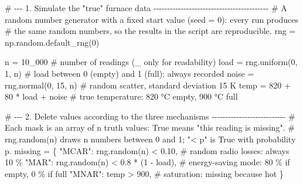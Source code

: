 \documentclass[
  letterpaper,
  DIV=11,
  numbers=noendperiod]{scrreprt}
\newenvironment{Shaded}{\begin{snugshade}}{\end{snugshade}}
\newcommand{\CommentTok}[1]{\textcolor[rgb]{0.37,0.37,0.37}{#1}}
\newcommand{\DecValTok}[1]{\textcolor[rgb]{0.68,0.00,0.00}{#1}}
\newcommand{\FloatTok}[1]{\textcolor[rgb]{0.68,0.00,0.00}{#1}}
\newcommand{\NormalTok}[1]{\textcolor[rgb]{0.00,0.23,0.31}{#1}}
\newcommand{\OperatorTok}[1]{\textcolor[rgb]{0.37,0.37,0.37}{#1}}
\newcommand{\StringTok}[1]{\textcolor[rgb]{0.13,0.47,0.30}{#1}}
\begin{document}
\begin{tcolorbox}[enhanced jigsaw, left=2mm, title=\textcolor{quarto-callout-caution-color}{\faFire}\hspace{0.5em}{Solution to Exercise 5}, opacityback=0, breakable, rightrule=.15mm, arc=.35mm, toptitle=1mm, colbacktitle=quarto-callout-caution-color!10!white, opacitybacktitle=0.6, coltitle=black, colframe=quarto-callout-caution-color-frame, bottomrule=.15mm, leftrule=.75mm, bottomtitle=1mm, titlerule=0mm, toprule=.15mm, colback=white]

\begin{Shaded}
\begin{Highlighting}[]
\CommentTok{\# {-}{-}{-} 1. Simulate the "true" furnace data {-}{-}{-}{-}{-}{-}{-}{-}{-}{-}{-}{-}{-}{-}{-}{-}{-}{-}{-}{-}{-}{-}{-}{-}{-}{-}{-}{-}{-}{-}{-}{-}{-}{-}{-}{-}{-}{-}{-}{-}{-}{-}}
\CommentTok{\# A random number generator with a fixed start value (seed = 0): every run produces}
\CommentTok{\# the same random numbers, so the results in the script are reproducible.}
\NormalTok{rng }\OperatorTok{=}\NormalTok{ np.random.default\_rng(}\DecValTok{0}\NormalTok{)}

\NormalTok{n }\OperatorTok{=} \DecValTok{10\_000}                                   \CommentTok{\# number of readings (\_ only for readability)}
\NormalTok{load }\OperatorTok{=}\NormalTok{ rng.uniform(}\DecValTok{0}\NormalTok{, }\DecValTok{1}\NormalTok{, n)                  }\CommentTok{\# load between 0 (empty) and 1 (full); always recorded}
\NormalTok{noise }\OperatorTok{=}\NormalTok{ rng.normal(}\DecValTok{0}\NormalTok{, }\DecValTok{15}\NormalTok{, n)                 }\CommentTok{\# random scatter, standard deviation 15 K}
\NormalTok{temp }\OperatorTok{=} \DecValTok{820} \OperatorTok{+} \DecValTok{80} \OperatorTok{*}\NormalTok{ load }\OperatorTok{+}\NormalTok{ noise               }\CommentTok{\# true temperature: 820 °C empty, 900 °C full}

\CommentTok{\# {-}{-}{-} 2. Delete values according to the three mechanisms {-}{-}{-}{-}{-}{-}{-}{-}{-}{-}{-}{-}{-}{-}{-}{-}{-}{-}{-}{-}{-}{-}{-}{-}{-}{-}{-}}
\CommentTok{\# Each mask is an array of n truth values: True means "this reading is missing".}
\CommentTok{\# rng.random(n) draws n numbers between 0 and 1; "\textless{} p" is True with probability p.}
\NormalTok{missing }\OperatorTok{=}\NormalTok{ \{}
    \StringTok{"MCAR"}\NormalTok{: rng.random(n) }\OperatorTok{\textless{}} \FloatTok{0.10}\NormalTok{,               }\CommentTok{\# random radio losses: always 10 \%}
    \StringTok{"MAR"}\NormalTok{:  rng.random(n) }\OperatorTok{\textless{}} \FloatTok{0.8} \OperatorTok{*}\NormalTok{ (}\DecValTok{1} \OperatorTok{{-}}\NormalTok{ load),   }\CommentTok{\# energy{-}saving mode: 80 \% if empty, 0 \% if full}
    \StringTok{"MNAR"}\NormalTok{: temp }\OperatorTok{\textgreater{}} \DecValTok{900}\NormalTok{,                         }\CommentTok{\# saturation: missing because hot}
\NormalTok{\}}


\end{Highlighting}
\end{Shaded}
\end{tcolorbox}
\end{document}
